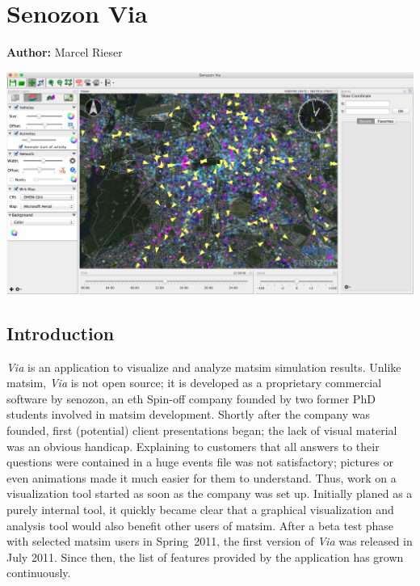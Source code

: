 \chapter{Senozon Via}
\label{ch:via}

\hfill \textbf{Author:} Marcel Rieser

\begin{center} \includegraphics[width=1.\textwidth, angle=0]{extending/figures/via/title.png} \end{center}



\def\Via{\emph{Via}}
\section{Introduction}
\Via{} is an application to visualize and analyze \gls{matsim} simulation results.
Unlike \gls{matsim}, \Via{} is not open source; it is developed as a proprietary commercial software
by \gls{senozon}, an \gls{eth} Spin-off company founded by two former PhD students
involved in \gls{matsim} development. Shortly after the company was founded, 
first (potential) client presentations began; the lack of visual material
was an obvious handicap. Explaining to customers that all answers to their questions were
contained in a huge events file was not satisfactory; pictures or
even animations made it much easier for them to understand. Thus,
 work on a visualization tool started as soon as the company
was set up. Initially planed as a purely internal tool, it quickly became clear
that a graphical visualization and analysis tool would also benefit 
other users of \gls{matsim}. After a beta test phase with selected \gls{matsim}
users in Spring~2011, the first version of \Via{} was released in July
2011. Since then, the list of features provided by the application has grown
continuously.

